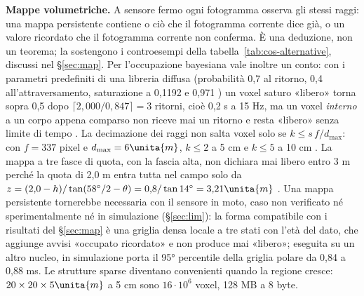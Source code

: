 \textbf{Mappe volumetriche.} A sensore fermo ogni fotogramma osserva gli stessi raggi: una mappa persistente contiene o ciò che il fotogramma corrente dice già, o un valore ricordato che il fotogramma corrente non conferma. È una deduzione, non un teorema; la sostengono i controesempi della tabella~\ref{tab:cos-alternative}, discussi nel \S\ref{sec:map}. Per l'occupazione bayesiana vale inoltre un conto: con i parametri predefiniti di una libreria diffusa (probabilità 0,7 al ritorno, 0,4 all'attraversamento, saturazione a 0,1192 e 0,971 \cite{octomap}) un voxel saturo «libero» torna sopra 0,5 dopo $\lceil 2{,}000/0{,}847\rceil=3$ ritorni, cioè 0,2 s a 15 Hz, ma un voxel \emph{interno} a un corpo appena comparso non riceve mai un ritorno e resta «libero» senza limite di tempo . La decimazione dei raggi non salta voxel solo se $k\le s\,f/d_{\max}$: con $f=337$ pixel e $d_{\max}=6\unita{m}$, $k\le2$ a 5 cm e $k\le5$ a 10 cm . La mappa a tre fasce di quota, con la fascia alta, non dichiara mai libero entro 3 m perché la quota di 2,0 m entra tutta nel campo solo da $z=(2{,}0-h)/\tan(58^\circ/2-\theta)=0{,}8/\tan14^\circ=3{,}21\unita{m}$ . Una mappa persistente tornerebbe necessaria con il sensore in moto, caso non verificato né sperimentalmente né in simulazione (\S\ref{sec:lim}): la forma compatibile con i risultati del \S\ref{sec:map} è una griglia densa locale a tre stati con l'età del dato, che aggiunge avvisi «occupato ricordato» e non produce mai «libero»; eseguita su un altro nucleo, in simulazione porta il 95° percentile della griglia polare da 0,84 a 0,88 ms. Le strutture sparse diventano convenienti quando la regione cresce: $20\times20\times5\unita{m}$ a 5 cm sono $16\cdot10^6$ voxel, 128 MB a 8 byte.

